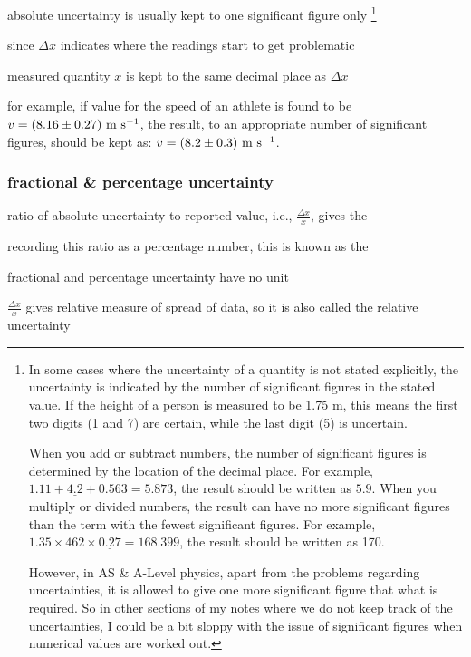 \cmt absolute uncertainty is usually kept to one significant figure only
\footnote{In some cases where the uncertainty of a quantity is not stated explicitly, the uncertainty is indicated by the number of significant figures in the stated value. If the height of a person is measured to be 1.75 m, this means the first two digits (1 and 7) are certain, while the last digit (5) is uncertain.
	
When you add or subtract numbers, the number of significant figures is determined by the location of the decimal place. For example, $1.11+\underline{4.2}+0.563=5.873$, the result should be written as $5.9$. When you multiply or divided numbers, the result can have no more significant figures than the term with the fewest significant figures. For example, $1.35\times462\times\underline{0.27} = 168.399$, the result should be written as 170.

However, in AS \& A-Level physics, apart from the problems regarding uncertainties, it is allowed to give one more significant figure that what is required. So in other sections of my notes where we do not keep track of the uncertainties, I could be a bit sloppy with the issue of significant figures when numerical values are worked out.}

since $\Delta x$ indicates where the readings start to get problematic

measured quantity $x$ is kept to the same decimal place as $\Delta x$

for example, if value for the speed of an athlete is found to be $v=(8.16\pm0.27)\text{ m s$^{-1}$}$, the result, to an appropriate number of significant figures, should be kept as: $v=(8.2\pm0.3) \text{ m s$^{-1}$}$.



\subsubsection{fractional \& percentage uncertainty}

ratio of absolute uncertainty to reported value, i.e., $\frac{\Delta x}{x}$, gives the 

recording this ratio as a percentage number, this is known as the 

\cmt fractional and percentage uncertainty have no unit

\cmt $\frac{\Delta x}{x}$ gives relative measure of spread of data, so it is also called the relative uncertainty

